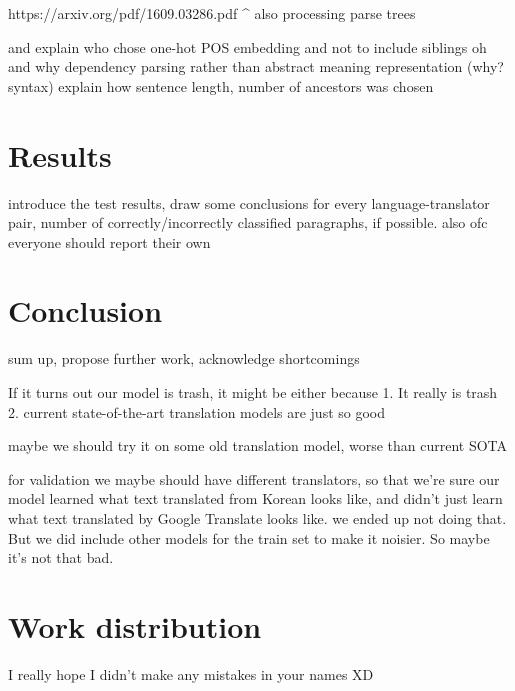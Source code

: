 \documentclass[twocolumn]{article}
\begin{document}
https://arxiv.org/pdf/1609.03286.pdf
^ also processing parse trees

and explain who chose one-hot POS embedding and not to include siblings oh and why dependency parsing rather than abstract meaning representation (why? syntax)
explain how sentence length, number of ancestors was chosen


\section*{Results}

introduce the test results, draw some conclusions
for every language-translator pair, number of correctly/incorrectly classified paragraphs, if possible. also ofc everyone should report their own

\section*{Conclusion}

sum up, propose further work, acknowledge shortcomings

If it turns out our model is trash, it might be either because 1. It really is trash 2. current state-of-the-art translation models are just so good

maybe we should try it on some old translation model, worse than current SOTA

for validation we maybe should have different translators, so that we're sure our model learned what text translated from Korean looks like, and didn't just learn what text translated by Google Translate looks like.
we ended up not doing that. But we did include other models for the train set to make it noisier. So maybe it’s not that bad. 


\section*{Work distribution}

I really hope I didn't make any mistakes in your names XD
\end{document}
